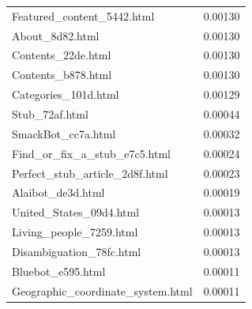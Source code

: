 \documentclass[11pt]{article}
\begin{document}
\begin{table}[h]
\begin{minipage}{0.5\textwidth}
\begin{tabular}{lc}
Featured\_content\_5442.html & 0.00130 \\
About\_8d82.html & 0.00130 \\
Contents\_22de.html & 0.00130 \\
Contents\_b878.html & 0.00130 \\
Categories\_101d.html & 0.00129 \\
Stub\_72af.html & 0.00044 \\
SmackBot\_cc7a.html & 0.00032 \\
Find\_or\_fix\_a\_stub\_e7c5.html & 0.00024 \\
Perfect\_stub\_article\_2d8f.html & 0.00023 \\
Alaibot\_de3d.html & 0.00019 \\
United\_States\_09d4.html & 0.00013 \\
Living\_people\_7259.html & 0.00013 \\
Disambiguation\_78fc.html & 0.00013 \\
Bluebot\_e595.html & 0.00011 \\
Geographic\_coordinate\_system.html & 0.00011
\end{tabular}
\end{minipage}
\end{table}
\end{document}
